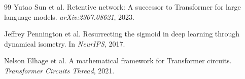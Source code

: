 \documentclass{article}
\begin{document}
\begin{thebibliography}{99}
Yutao Sun et al.
Retentive network: A successor to Transformer for large language models.
\emph{arXiv:2307.08621}, 2023.

Jeffrey Pennington et al.
Resurrecting the sigmoid in deep learning through dynamical isometry.
In \emph{NeurIPS}, 2017.

Nelson Elhage et al.
A mathematical framework for Transformer circuits.
\emph{Transformer Circuits Thread}, 2021.

\end{thebibliography}
\end{document}
